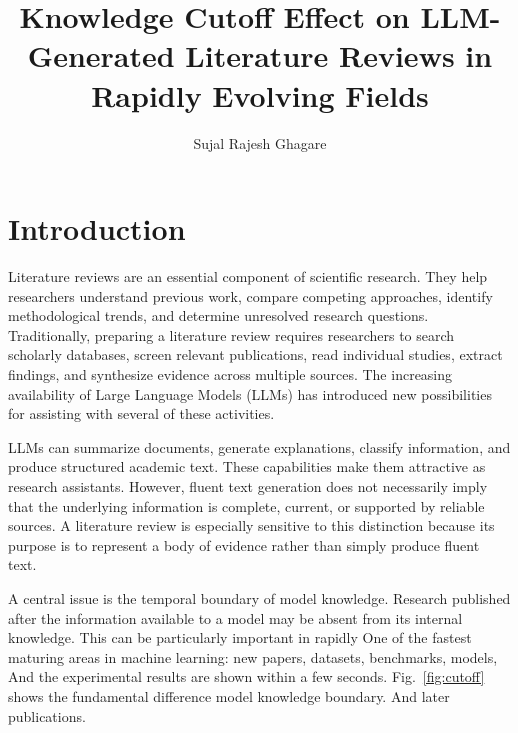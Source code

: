 \documentclass[acmsmall,screen]{acmart}
\title{Knowledge Cutoff Effect on LLM-Generated Literature Reviews in Rapidly Evolving Fields}
\author{Sujal Rajesh Ghagare}
\affiliation{%
  \institution{Indian Institute of Information Technology Allahabad}
  \department{Department of Information Technology}
  \city{Prayagraj}
  \country{India}
}
\begin{document}
\maketitle

\section{Introduction}

Literature reviews are an essential component of scientific research.
They help researchers understand previous work, compare competing
approaches, identify methodological trends, and determine unresolved
research questions. Traditionally, preparing a literature review
requires researchers to search scholarly databases, screen relevant
publications, read individual studies, extract findings, and synthesize
evidence across multiple sources. The increasing availability of Large
Language Models (LLMs) has introduced new possibilities for assisting
with several of these activities.

LLMs can summarize documents, generate explanations, classify
information, and produce structured academic text. These capabilities
make them attractive as research assistants. However, fluent text
generation does not necessarily imply that the underlying information
is complete, current, or supported by reliable sources. A literature
review is especially sensitive to this distinction because its purpose
is to represent a body of evidence rather than simply produce fluent
text.

A central issue is the temporal boundary of model knowledge. Research
published after the information available to a model may be absent from
its internal knowledge. This can be particularly important in rapidly
One of the fastest maturing areas in machine learning: new papers, datasets, benchmarks, models,
And the experimental results are shown within a few seconds. Fig.~\ref{fig:cutoff}
 shows the fundamental difference model knowledge boundary.
And later publications.
\end{document}
